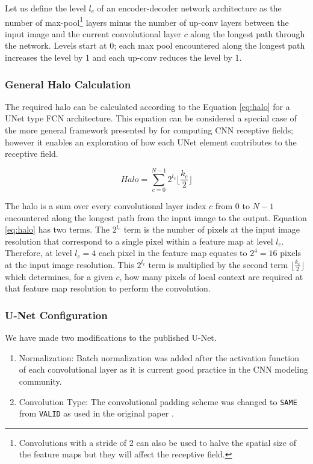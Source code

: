 \documentclass[twoside,11pt]{article}
\begin{document}
Let us define the level $l_{c}$ of an encoder-decoder network architecture as the number of max-pool\footnote{Convolutions with a stride of 2 can also be used to halve the spatial size of the feature maps but they will affect the receptive field.} layers minus the number of up-conv layers between the input image and the current convolutional layer $c$ along the longest path through the network. Levels start at 0; each max pool encountered along the longest path increases the level by 1 and each up-conv reduces the level by 1. 


\subsubsection{General Halo Calculation}

The required halo can be calculated according to the Equation \ref{eq:halo} for a UNet type FCN architecture. This equation can be considered a special case of the more general framework presented by \cite{araujo2019computing} for computing CNN receptive fields; however it enables an exploration of how each UNet element contributes to the receptive field. 

\begin{equation}
Halo = \sum_{c=0}^{N-1} 2^{l_c} \lfloor \frac{k_c}{2} \rfloor
\label{eq:halo}
\end{equation}

The halo is a sum over every convolutional layer index $c$ from $0$ to $N-1$ encountered along the longest path from the input image to the output. 
Equation \ref{eq:halo} has two terms. The $2^{l_c}$ term is the number of pixels at the input image resolution that correspond to a single pixel within a feature map at level $l_c$. 
Therefore, at level $l_c=4$ each pixel in the feature map equates to $2^4 = 16$ pixels at the input image resolution. This $2^{l_c}$ term is multiplied by the second term $\lfloor \frac{k_c}{2} \rfloor$ which determines, for a given $c$, how many pixels of local context are required at that feature map resolution to perform the convolution.

\subsubsection{U-Net Configuration}

We have made two modifications to the published U-Net. 

\begin{enumerate}
	\item Normalization: Batch normalization \citep{ioffe2015batch} was added after the activation function of each convolutional layer as it is current good practice in the CNN modeling community. 
	\item Convolution Type: The convolutional padding scheme was changed to \texttt{SAME} from \texttt{VALID} as used in the original paper \citep{Ronneberger2015a}.
\end{enumerate} 
\end{document}
